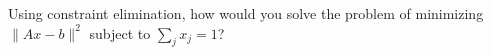 \documentclass[12pt, leqno]{article}
\begin{document}

Using constraint elimination, how would you solve the problem of minimizing
$\|Ax-b\|^2$ subject to $\sum_j x_j = 1$?
\end{document}
